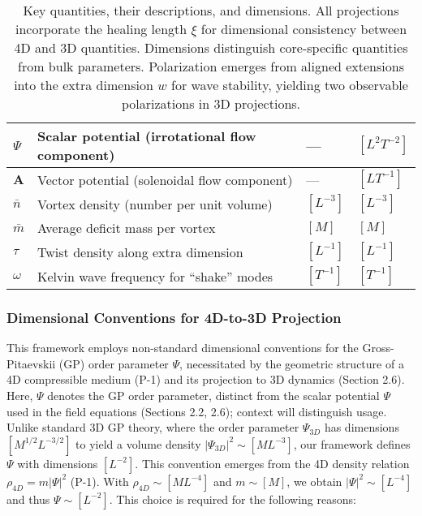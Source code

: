 \begin{table}[H]
\begin{tabularx}{\textwidth}{|l|Y|l|l|}
\hline
$\Psi$ & Scalar potential (irrotational flow component) & --- & $[L^2 T^{-2}]$ \\
\hline
$\mathbf{A}$ & Vector potential (solenoidal flow component) & --- & $[L T^{-1}]$ \\
\hline
$\bar{n}$ & Vortex density (number per unit volume) & $[L^{-3}]$ & $[L^{-3}]$ \\
\hline
$\bar{m}$ & Average deficit mass per vortex & $[M]$ & $[M]$ \\
\hline
$\tau$ & Twist density along extra dimension & $[L^{-1}]$ & $[L^{-1}]$ \\
\hline
$\omega$ & Kelvin wave frequency for ``shake'' modes & $[T^{-1}]$ & $[T^{-1}]$ \\
\hline
\end{tabularx}
\caption{Key quantities, their descriptions, and dimensions. All projections incorporate the healing length $\xi$ for dimensional consistency between 4D and 3D quantities. Dimensions distinguish core-specific quantities from bulk parameters. Polarization emerges from aligned extensions into the extra dimension $w$ for wave stability, yielding two observable polarizations in 3D projections.}
\label{tab:notation}
\end{table}

\subsubsection{Dimensional Conventions for 4D-to-3D Projection}
\label{subsec:dimensional_conventions}

This framework employs non-standard dimensional conventions for the Gross-Pitaevskii (GP) order parameter $\Psi$, necessitated by the geometric structure of a 4D compressible medium (P-1) and its projection to 3D dynamics (Section 2.6). Here, $\Psi$ denotes the GP order parameter, distinct from the scalar potential $\Psi$ used in the field equations (Sections 2.2, 2.6); context will distinguish usage. Unlike standard 3D GP theory, where the order parameter $\Psi_{3D}$ has dimensions $[M^{1/2} L^{-3/2}]$ to yield a volume density $|\Psi_{3D}|^2 \sim [M L^{-3}]$, our framework defines $\Psi$ with dimensions $[L^{-2}]$. This convention emerges from the 4D density relation $\rho_{4D} = m |\Psi|^2$ (P-1). With $\rho_{4D} \sim [M L^{-4}]$ and $m \sim [M]$, we obtain $|\Psi|^2 \sim [L^{-4}]$ and thus $\Psi \sim [L^{-2}]$. This choice is required for the following reasons:

